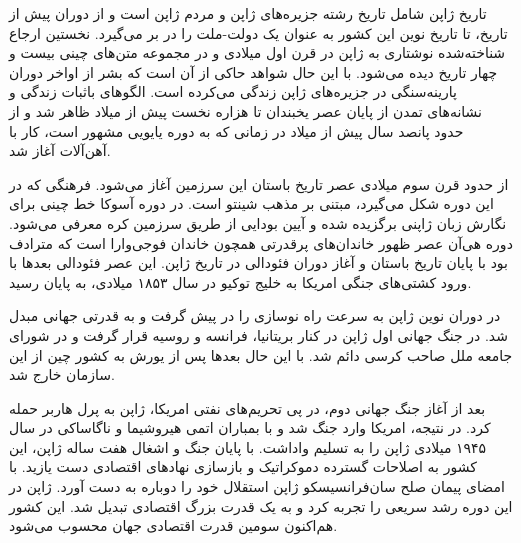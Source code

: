 تاریخ ژاپن شامل تاریخ رشته جزیره‌های ژاپن و مردم ژاپن است و از دوران پیش از تاریخ، تا تاریخ نوین این کشور به عنوان یک دولت-ملت را در بر می‌گیرد. نخستین ارجاع شناخته‌شده نوشتاری به ژاپن در قرن اول میلادی و در مجموعه متن‌های چینی بیست و چهار تاریخ دیده می‌شود. با این حال شواهد حاکی از آن است که بشر از اواخر دوران پارینه‌سنگی در جزیره‌های ژاپن زندگی می‌کرده است. الگوهای باثبات زندگی و نشانه‌های تمدن از پایان عصر یخبندان تا هزاره نخست پیش از میلاد ظاهر شد و از حدود پانصد سال پیش از میلاد در زمانی که به دوره یایویی مشهور است، کار با آهن‌آلات آغاز شد.

از حدود قرن سوم میلادی عصر تاریخ باستان این سرزمین آغاز می‌شود. فرهنگی که در این دوره شکل می‌گیرد، مبتنی بر مذهب شینتو است. در دوره آسوکا خط چینی برای نگارش زبان ژاپنی برگزیده شده و آیین بودایی از طریق سرزمین کره معرفی می‌شود. دوره هی‌آن عصر ظهور خاندان‌های پرقدرتی همچون خاندان فوجی‌وارا است که مترادف بود با پایان تاریخ باستان و آغاز دوران فئودالی در تاریخ ژاپن. این عصر فئودالی بعدها با ورود کشتی‌های جنگی امریکا به خلیج توکیو در سال ۱۸۵۳ میلادی، به پایان رسید.

در دوران نوین ژاپن به سرعت راه نوسازی را در پیش گرفت و به قدرتی جهانی مبدل شد. در جنگ جهانی اول ژاپن در کنار بریتانیا، فرانسه و روسیه قرار گرفت و در شورای جامعه ملل صاحب کرسی دائم شد. با این حال بعدها پس از یورش به کشور چین از این سازمان خارج شد.

بعد از آغاز جنگ جهانی دوم، در پی تحریم‌های نفتی امریکا، ژاپن به پرل هاربر حمله کرد. در نتیجه، امریکا وارد جنگ شد و با بمباران اتمی هیروشیما و ناگاساکی در سال ۱۹۴۵ میلادی ژاپن را به تسلیم واداشت. با پایان جنگ و اشغال هفت ساله ژاپن، این کشور به اصلاحات گسترده دموکراتیک و بازسازی نهادهای اقتصادی دست یازید. با امضای پیمان صلح سان‌فرانسیسکو ژاپن استقلال خود را دوباره به دست آورد. ژاپن در این دوره رشد سریعی را تجربه کرد و به یک قدرت بزرگ اقتصادی تبدیل شد. این کشور هم‌اکنون سومین قدرت اقتصادی جهان محسوب می‌شود.
